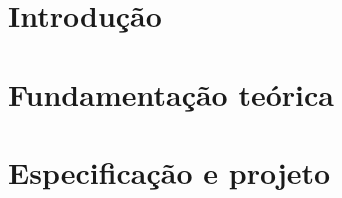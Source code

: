 \documentclass[11pt,a4paper]{article}
\begin{document}
\capa

\begin{resumo}
\end{resumo}

\section{Introdução}




\section{Fundamentação teórica}





\section{Especificação e projeto}
\end{document}
